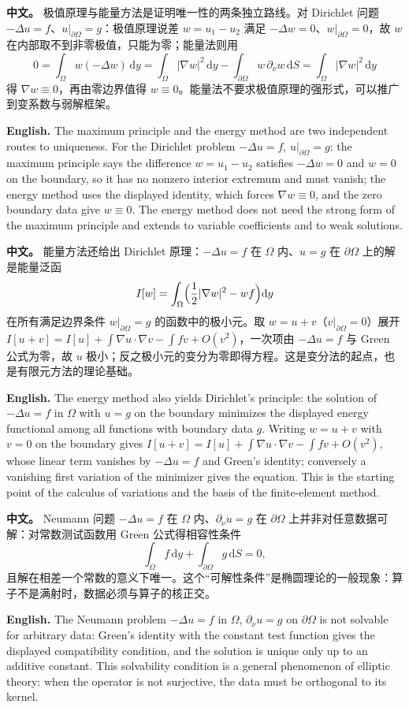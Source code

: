 \documentclass[UTF8,11pt,a4paper]{ctexart}
\newcommand{\APS}[2]{\par\noindent\textbf{中文。} #1\par\noindent\textbf{English.} #2\par\smallskip}
\newcommand{\dd}{\mathrm{d}}
\begin{document}
\APS{极值原理与能量方法是证明唯一性的两条独立路线。对 Dirichlet 问题 $-\Delta u=f$、$u|_{\partial\Omega}=g$：极值原理说差 $w=u_1-u_2$ 满足 $-\Delta w=0$、$w|_{\partial\Omega}=0$，故 $w$ 在内部取不到非零极值，只能为零；能量法则用
\[
0=\int_\Omega w(-\Delta w)\,\dd y=\int_\Omega|\nabla w|^2\,\dd y-\int_{\partial\Omega}w\,\partial_\nu w\,\dd S=\int_\Omega|\nabla w|^2\,\dd y
\]
得 $\nabla w\equiv0$，再由零边界值得 $w\equiv0$。能量法不要求极值原理的强形式，可以推广到变系数与弱解框架。}{The maximum principle and the energy method are two independent routes to uniqueness. For the Dirichlet problem $-\Delta u=f$, $u|_{\partial\Omega}=g$: the maximum principle says the difference $w=u_1-u_2$ satisfies $-\Delta w=0$ and $w=0$ on the boundary, so it has no nonzero interior extremum and must vanish; the energy method uses the displayed identity, which forces $\nabla w\equiv0$, and the zero boundary data give $w\equiv0$. The energy method does not need the strong form of the maximum principle and extends to variable coefficients and to weak solutions.}

\APS{能量方法还给出 Dirichlet 原理：$-\Delta u=f$ 在 $\Omega$ 内、$u=g$ 在 $\partial\Omega$ 上的解是能量泛函
\[
I[w]=\int_\Omega\Bigl(\frac12|\nabla w|^2-wf\Bigr)\dd y
\]
在所有满足边界条件 $w|_{\partial\Omega}=g$ 的函数中的极小元。取 $w=u+v$（$v|_{\partial\Omega}=0$）展开 $I[u+v]=I[u]+\int\nabla u\cdot\nabla v-\int fv+O(v^2)$，一次项由 $-\Delta u=f$ 与 Green 公式为零，故 $u$ 极小；反之极小元的变分为零即得方程。这是变分法的起点，也是有限元方法的理论基础。}{The energy method also yields Dirichlet's principle: the solution of $-\Delta u=f$ in $\Omega$ with $u=g$ on the boundary minimizes the displayed energy functional among all functions with boundary data $g$. Writing $w=u+v$ with $v=0$ on the boundary gives $I[u+v]=I[u]+\int\nabla u\cdot\nabla v-\int fv+O(v^2)$, whose linear term vanishes by $-\Delta u=f$ and Green's identity; conversely a vanishing first variation of the minimizer gives the equation. This is the starting point of the calculus of variations and the basis of the finite-element method.}

\APS{Neumann 问题 $-\Delta u=f$ 在 $\Omega$ 内、$\partial_\nu u=g$ 在 $\partial\Omega$ 上并非对任意数据可解：对常数测试函数用 Green 公式得相容性条件
\[
\int_\Omega f\,\dd y+\int_{\partial\Omega}g\,\dd S=0,
\]
且解在相差一个常数的意义下唯一。这个``可解性条件''是椭圆理论的一般现象：算子不是满射时，数据必须与算子的核正交。}{The Neumann problem $-\Delta u=f$ in $\Omega$, $\partial_\nu u=g$ on $\partial\Omega$ is not solvable for arbitrary data: Green's identity with the constant test function gives the displayed compatibility condition, and the solution is unique only up to an additive constant. This solvability condition is a general phenomenon of elliptic theory: when the operator is not surjective, the data must be orthogonal to its kernel.}
\end{document}
